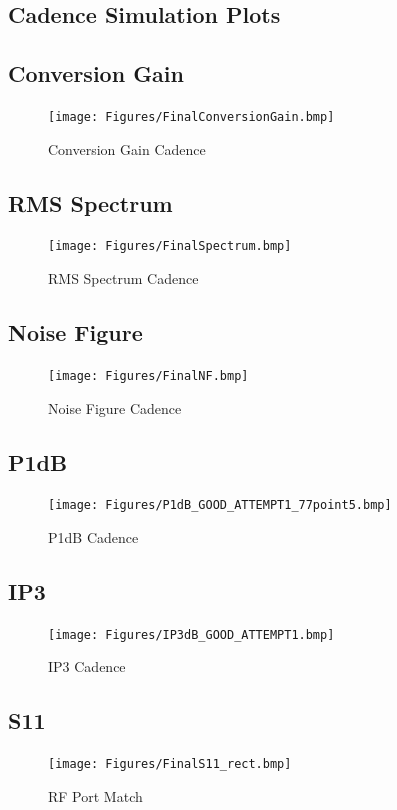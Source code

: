 \documentclass{article}                                                         %
\begin{document}
\newpage
\begin{appendices}
\section{Cadence Simulation Plots}\label{app:cresults}
\subsection{Conversion Gain}
\begin{figure}[H]
  \centering
  \texttt{[image: Figures/FinalConversionGain.bmp]}
  \caption{Conversion Gain Cadence}
    \label{fig:cGain}
\end{figure}
\subsection{RMS Spectrum}
\begin{figure}[H]
  \centering
  \texttt{[image: Figures/FinalSpectrum.bmp]}
  \caption{RMS Spectrum Cadence}
    \label{fig:cSpectrum}
\end{figure}
\subsection{Noise Figure}
\begin{figure}[H]
  \centering
  \texttt{[image: Figures/FinalNF.bmp]}
  \caption{Noise Figure Cadence}
    \label{fig:cNF}
\end{figure}
\subsection{P1dB}
\begin{figure}[H]
  \centering
  \texttt{[image: Figures/P1dB\_GOOD\_ATTEMPT1\_77point5.bmp]}
  \caption{P1dB Cadence}
    \label{fig:cP1db}
\end{figure}
\subsection{IP3}
\begin{figure}[H]
  \centering
  \texttt{[image: Figures/IP3dB\_GOOD\_ATTEMPT1.bmp]}
  \caption{IP3 Cadence}
    \label{fig:cIP3}
\end{figure}
\subsection{S11}
\begin{figure}[H]
  \centering
  \texttt{[image: Figures/FinalS11\_rect.bmp]}
  \caption{RF Port Match}
    \label{fig:cS11}
\end{figure}

\end{appendices}
\end{document}

